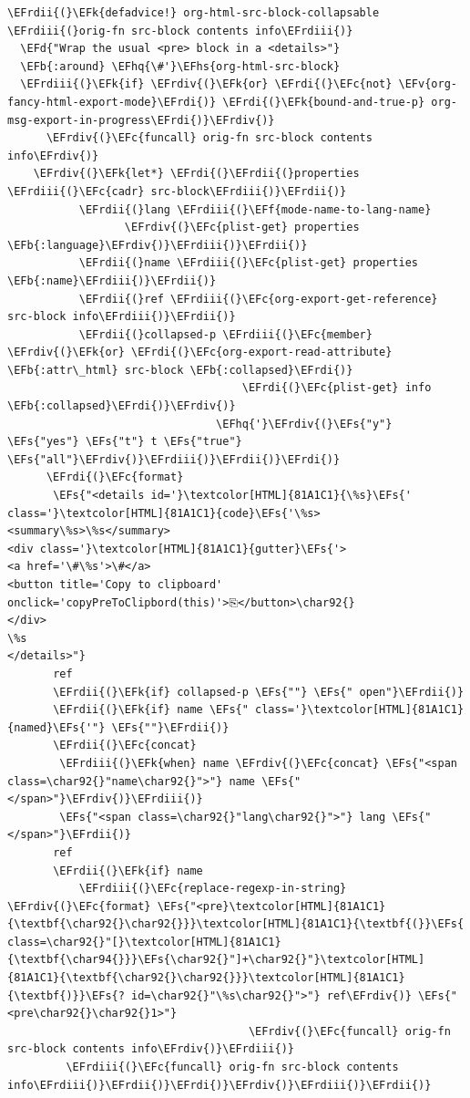 \documentclass{scrartcl}
\newcommand{\EFk}[1]{\textcolor{EFk}{#1}} %
\newcommand{\EFd}[1]{\textcolor{EFd}{#1}} %
\newcommand{\EFs}[1]{\textcolor{EFs}{#1}} %
\newcommand{\EFb}[1]{\textcolor{EFb}{#1}} %
\newcommand{\EFc}[1]{\textcolor{EFc}{#1}} %
\newcommand{\EFv}[1]{\textcolor{EFv}{#1}} %
\newcommand{\EFf}[1]{\textcolor{EFf}{#1}} %
\newcommand{\EFhq}[1]{#1} %
\newcommand{\EFhs}[1]{#1} %
\newcommand{\EFrdi}[1]{#1} %
\newcommand{\EFrdii}[1]{#1} %
\newcommand{\EFrdiii}[1]{#1} %
\newcommand{\EFrdiv}[1]{#1} %
\begin{document}
\begin{Code}
\begin{Verbatim}[]
\EFrdii{(}\EFk{defadvice!} org-html-src-block-collapsable \EFrdiii{(}orig-fn src-block contents info\EFrdiii{)}
  \EFd{"Wrap the usual <pre> block in a <details>"}
  \EFb{:around} \EFhq{\#'}\EFhs{org-html-src-block}
  \EFrdiii{(}\EFk{if} \EFrdiv{(}\EFk{or} \EFrdi{(}\EFc{not} \EFv{org-fancy-html-export-mode}\EFrdi{)} \EFrdi{(}\EFk{bound-and-true-p} org-msg-export-in-progress\EFrdi{)}\EFrdiv{)}
      \EFrdiv{(}\EFc{funcall} orig-fn src-block contents info\EFrdiv{)}
    \EFrdiv{(}\EFk{let*} \EFrdi{(}\EFrdii{(}properties \EFrdiii{(}\EFc{cadr} src-block\EFrdiii{)}\EFrdii{)}
           \EFrdii{(}lang \EFrdiii{(}\EFf{mode-name-to-lang-name}
                  \EFrdiv{(}\EFc{plist-get} properties \EFb{:language}\EFrdiv{)}\EFrdiii{)}\EFrdii{)}
           \EFrdii{(}name \EFrdiii{(}\EFc{plist-get} properties \EFb{:name}\EFrdiii{)}\EFrdii{)}
           \EFrdii{(}ref \EFrdiii{(}\EFc{org-export-get-reference} src-block info\EFrdiii{)}\EFrdii{)}
           \EFrdii{(}collapsed-p \EFrdiii{(}\EFc{member} \EFrdiv{(}\EFk{or} \EFrdi{(}\EFc{org-export-read-attribute} \EFb{:attr\_html} src-block \EFb{:collapsed}\EFrdi{)}
                                    \EFrdi{(}\EFc{plist-get} info \EFb{:collapsed}\EFrdi{)}\EFrdiv{)}
                                \EFhq{'}\EFrdiv{(}\EFs{"y"} \EFs{"yes"} \EFs{"t"} t \EFs{"true"} \EFs{"all"}\EFrdiv{)}\EFrdiii{)}\EFrdii{)}\EFrdi{)}
      \EFrdi{(}\EFc{format}
       \EFs{"<details id='}\textcolor[HTML]{81A1C1}{\%s}\EFs{' class='}\textcolor[HTML]{81A1C1}{code}\EFs{'\%s><summary\%s>\%s</summary>
<div class='}\textcolor[HTML]{81A1C1}{gutter}\EFs{'>
<a href='\#\%s'>\#</a>
<button title='Copy to clipboard' onclick='copyPreToClipbord(this)'>⎘</button>\char92{}
</div>
\%s
</details>"}
       ref
       \EFrdii{(}\EFk{if} collapsed-p \EFs{""} \EFs{" open"}\EFrdii{)}
       \EFrdii{(}\EFk{if} name \EFs{" class='}\textcolor[HTML]{81A1C1}{named}\EFs{'"} \EFs{""}\EFrdii{)}
       \EFrdii{(}\EFc{concat}
        \EFrdiii{(}\EFk{when} name \EFrdiv{(}\EFc{concat} \EFs{"<span class=\char92{}"name\char92{}">"} name \EFs{"</span>"}\EFrdiv{)}\EFrdiii{)}
        \EFs{"<span class=\char92{}"lang\char92{}">"} lang \EFs{"</span>"}\EFrdii{)}
       ref
       \EFrdii{(}\EFk{if} name
           \EFrdiii{(}\EFc{replace-regexp-in-string} \EFrdiv{(}\EFc{format} \EFs{"<pre}\textcolor[HTML]{81A1C1}{\textbf{\char92{}\char92{}}}\textcolor[HTML]{81A1C1}{\textbf{(}}\EFs{ class=\char92{}"[}\textcolor[HTML]{81A1C1}{\textbf{\char94{}}}\EFs{\char92{}"]+\char92{}"}\textcolor[HTML]{81A1C1}{\textbf{\char92{}\char92{}}}\textcolor[HTML]{81A1C1}{\textbf{)}}\EFs{? id=\char92{}"\%s\char92{}">"} ref\EFrdiv{)} \EFs{"<pre\char92{}\char92{}1>"}
                                     \EFrdiv{(}\EFc{funcall} orig-fn src-block contents info\EFrdiv{)}\EFrdiii{)}
         \EFrdiii{(}\EFc{funcall} orig-fn src-block contents info\EFrdiii{)}\EFrdii{)}\EFrdi{)}\EFrdiv{)}\EFrdiii{)}\EFrdii{)}


\end{Verbatim}
\end{Code}
\end{document}
